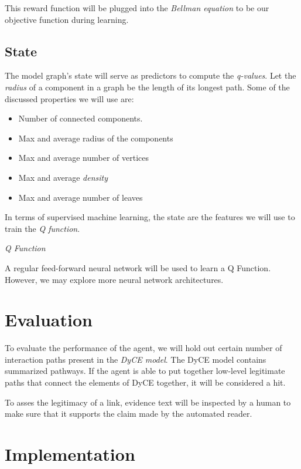 \documentclass[12pt]{article}
\begin{document}

This reward function will be plugged into the \emph{Bellman equation} to be our objective function during learning.

\subsection{State}

The model graph's state will serve as predictors to compute the \emph{q-values}. Let the \emph{radius} of a component in a graph be the length of its longest path. Some of the discussed properties we will use are:

\begin{itemize}
  \item Number of connected components.
  \item Max and average radius of the components
  \item Max and average number of vertices
  \item Max and average \emph{density}
  \item Max and average number of leaves
\end{itemize}

In terms of supervised machine learning, the state are the features we will use to train the \emph{Q function}.

\emph{Q Function}

A regular feed-forward neural network will be used to learn a Q Function. However, we may explore more neural network architectures.

\section{Evaluation}

To evaluate the performance of the agent, we will hold out certain number of interaction paths present in the \emph{DyCE model}. The DyCE model contains summarized pathways. If the agent is able to put together low-level legitimate paths that connect the elements of DyCE together, it will be considered a hit.

To asses the legitimacy of a link, evidence text will be inspected by a human to make sure that it supports the claim made by the automated reader.




\section{Implementation}
\end{document}
